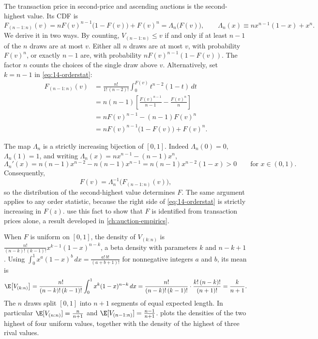 The transaction price in second-price and ascending auctions is the second-highest value. Its CDF is
\begin{equation}\label{eq:14-second-highest}
F_{(n-1:n)}(v)=nF(v)^{n-1}\bigl(1-F(v)\bigr)+F(v)^n=\Lambda_n\bigl(F(v)\bigr),\qquad
\Lambda_n(x)\equiv nx^{n-1}(1-x)+x^n.
\end{equation}
We derive it in two ways. By counting, $V_{(n-1:n)}\le v$ if and only if at least $n-1$ of the $n$ draws are at
most $v$. Either all $n$ draws are at most $v$, with probability $F(v)^n$, or exactly $n-1$ are, with
probability $nF(v)^{n-1}(1-F(v))$. The factor $n$ counts the choices of the single draw above $v$.
Alternatively, set $k=n-1$ in \eqref{eq:14-orderstat}:
\begin{align*}
F_{(n-1:n)}(v)&=\frac{n!}{1!\,(n-2)!}\int_0^{F(v)}t^{n-2}(1-t)\,dt\\
&=n(n-1)\left[\frac{F(v)^{n-1}}{n-1}-\frac{F(v)^n}{n}\right]\\
&=nF(v)^{n-1}-(n-1)F(v)^n\\
&=nF(v)^{n-1}\bigl(1-F(v)\bigr)+F(v)^n.
\end{align*}

The map $\Lambda_n$ is a strictly increasing bijection of $[0,1]$. Indeed $\Lambda_n(0)=0$, $\Lambda_n(1)=1$,
and writing $\Lambda_n(x)=nx^{n-1}-(n-1)x^n$,
\[
\Lambda_n'(x)=n(n-1)x^{n-2}-n(n-1)x^{n-1}=n(n-1)x^{n-2}(1-x)>0\qquad\text{for }x\in(0,1).
\]
Consequently,
\begin{equation}\label{eq:14-lambda-inverse}
F(v)=\Lambda_n^{-1}\bigl(F_{(n-1:n)}(v)\bigr),
\end{equation}
so the distribution of the second-highest value determines $F$. The same argument applies to any order
statistic, because the right side of \eqref{eq:14-orderstat} is strictly increasing in $F(z)$.
\citet[Theorem~1]{AtheyHaile2002} use this fact to show that $F$ is identified from transaction prices
alone, a result developed in \cref{ch:auction-empirics}.

When $F$ is uniform on $[0,1]$, the density of $V_{(k:n)}$ is
$\frac{n!}{(n-k)!\,(k-1)!}x^{k-1}(1-x)^{n-k}$, a beta density with parameters $k$ and $n-k+1$. Using
$\int_0^1x^a(1-x)^b\,dx=\frac{a!\,b!}{(a+b+1)!}$ for nonnegative integers $a$ and $b$, its mean is
\begin{equation}\label{eq:14-uniform-means}
\E\bigl[V_{(k:n)}\bigr]=\frac{n!}{(n-k)!\,(k-1)!}\int_0^1x^{k}(1-x)^{n-k}\,dx
=\frac{n!}{(n-k)!\,(k-1)!}\cdot\frac{k!\,(n-k)!}{(n+1)!}=\frac{k}{n+1}.
\end{equation}
The $n$ draws split $[0,1]$ into $n+1$ segments of equal expected length. In particular
$\E[V_{(n:n)}]=\frac{n}{n+1}$ and $\E[V_{(n-1:n)}]=\frac{n-1}{n+1}$.  plots the
densities of the two highest of four uniform values, together with the density of the highest of three
rival values.

